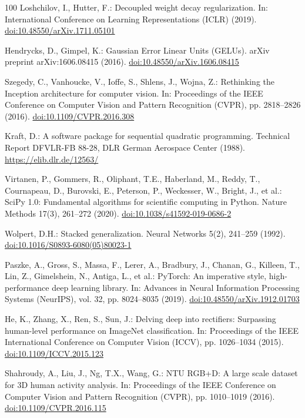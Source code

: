 \documentclass[preprint,12pt]{elsarticle}
\begin{document}
\begin{thebibliography}{100}
Loshchilov, I., Hutter, F.: Decoupled weight decay regularization. In: International Conference on Learning Representations (ICLR) (2019). \href{https://doi.org/10.48550/arXiv.1711.05101}{doi:10.48550/arXiv.1711.05101}

Hendrycks, D., Gimpel, K.: Gaussian Error Linear Units (GELUs). arXiv preprint arXiv:1606.08415 (2016). \href{https://doi.org/10.48550/arXiv.1606.08415}{doi:10.48550/arXiv.1606.08415}

Szegedy, C., Vanhoucke, V., Ioffe, S., Shlens, J., Wojna, Z.: Rethinking the Inception architecture for computer vision. In: Proceedings of the IEEE Conference on Computer Vision and Pattern Recognition (CVPR), pp. 2818--2826 (2016). \href{https://doi.org/10.1109/CVPR.2016.308}{doi:10.1109/CVPR.2016.308}

Kraft, D.: A software package for sequential quadratic programming. Technical Report DFVLR-FB 88-28, DLR German Aerospace Center (1988). \url{https://elib.dlr.de/12563/}

Virtanen, P., Gommers, R., Oliphant, T.E., Haberland, M., Reddy, T., Cournapeau, D., Burovski, E., Peterson, P., Weckesser, W., Bright, J., et al.: SciPy 1.0: Fundamental algorithms for scientific computing in Python. Nature Methods 17(3), 261--272 (2020). \href{https://doi.org/10.1038/s41592-019-0686-2}{doi:10.1038/s41592-019-0686-2}

Wolpert, D.H.: Stacked generalization. Neural Networks 5(2), 241--259 (1992). \href{https://doi.org/10.1016/S0893-6080(05)80023-1}{doi:10.1016/S0893-6080(05)80023-1}

Paszke, A., Gross, S., Massa, F., Lerer, A., Bradbury, J., Chanan, G., Killeen, T., Lin, Z., Gimelshein, N., Antiga, L., et al.: PyTorch: An imperative style, high-performance deep learning library. In: Advances in Neural Information Processing Systems (NeurIPS), vol. 32, pp. 8024--8035 (2019). \href{https://doi.org/10.48550/arXiv.1912.01703}{doi:10.48550/arXiv.1912.01703}

He, K., Zhang, X., Ren, S., Sun, J.: Delving deep into rectifiers: Surpassing human-level performance on ImageNet classification. In: Proceedings of the IEEE International Conference on Computer Vision (ICCV), pp. 1026--1034 (2015). \href{https://doi.org/10.1109/ICCV.2015.123}{doi:10.1109/ICCV.2015.123}

Shahroudy, A., Liu, J., Ng, T.X., Wang, G.: NTU RGB+D: A large scale dataset for 3D human activity analysis. In: Proceedings of the IEEE Conference on Computer Vision and Pattern Recognition (CVPR), pp. 1010--1019 (2016). \href{https://doi.org/10.1109/CVPR.2016.115}{doi:10.1109/CVPR.2016.115}


\end{thebibliography}
\end{document}
